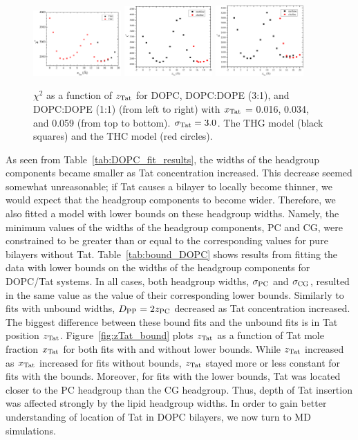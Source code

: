 \begin{figure}[htbp]
  \includegraphics[width=0.3\textwidth]{figures/Tat/SDP_Results/X2/DOPC_Tat_16to1_3p0_X2}
  \includegraphics[width=0.3\textwidth]{figures/Tat/SDP_Results/X2/DOPCDOPE3to1_Tat_16to1_3p0_X2}
  \includegraphics[width=0.3\textwidth]{figures/Tat/SDP_Results/X2/DOPCDOPE1to1_Tat_16to1_3p0_X2}
  \caption{$\chi^2$ as a function of $z_\textrm{Tat}$ for DOPC, DOPC:DOPE (3:1), and 
  DOPC:DOPE (1:1) (from left to right) 
  with $x_\textrm{Tat}$ = 0.016, 0.034, and 0.059 (from top to bottom). 
  $\sigma_\textrm{Tat} = 3.0$. The THG model (black squares) and the THC model (red circles).}
  \label{fig:DOPC_Tat_X2}
\end{figure}

As seen from Table~\ref{tab:DOPC_fit_results}, 
the widths of the headgroup components
became smaller as Tat concentration increased. This
decrease seemed somewhat unreasonable; if Tat causes a bilayer 
to locally become thinner, 
we would expect that the headgroup components to become
wider. Therefore, we also fitted a model with lower bounds
on these headgroup widths. Namely, the minimum values of the widths of
the headgroup components, PC and CG, were constrained to be greater than
or equal to the corresponding values for pure bilayers without Tat. 
Table~\ref{tab:bound_DOPC} shows results from fitting the data with
lower bounds on the widths of the headgroup components for DOPC/Tat systems.
In all cases, both headgroup widths, $\sigma_\textrm{PC}$ and $\sigma_\textrm{CG}$, resulted 
in the same value as the value of their corresponding lower bounds. 
Similarly to fits with unbound widths, $D_\textrm{PP}=2z_\textrm{PC}$ decreased as Tat concentration
increased. The biggest difference between these bound fits and the unbound fits
is in Tat position $z_\textrm{Tat}$. Figure~\ref{fig:zTat_bound} plots $z_\textrm{Tat}$ as a function
of Tat mole fraction $x_\textrm{Tat}$ for both fits with and without lower bounds.
While $z_\textrm{Tat}$ increased as $x_\textrm{Tat}$ increased for fits without bounds, $z_\textrm{Tat}$
stayed more or less constant for fits with the bounds. Moreover, 
for fits with the lower bounds, 
Tat was located closer to the PC headgroup than the CG headgroup. Thus,
depth of Tat insertion was affected strongly by the lipid headgroup widths.
In order to gain better understanding of location of Tat in DOPC bilayers,
we now turn to MD simulations.

